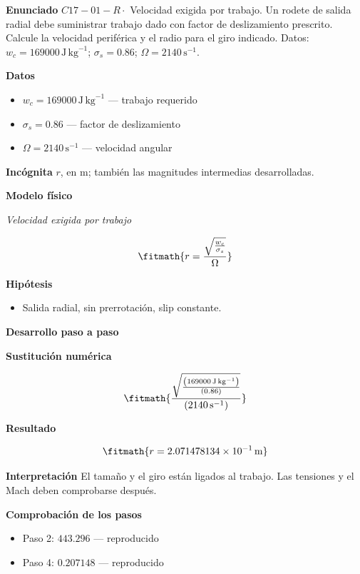\documentclass[10pt,openany]{book}
\begin{document}
\begin{tcolorbox}[title={Problema resuelto 1}, studiumworked, breakable]

\noindent\textbf{Enunciado}
\(C17-01-R \cdot\) Velocidad exigida por trabajo. Un rodete de salida radial debe suministrar trabajo dado con factor de deslizamiento prescrito. Calcule la velocidad periférica y el radio para el giro indicado. Datos: \(w_c=169000\, \mathrm{J}\,\mathrm{kg}^{-1}\); \(\sigma_s=0.86\); \(\Omega=2140\, \mathrm{s}^{-1}\).

\noindent\textbf{Datos}
\begin{itemize}
\item $w_c = 169000\,\mathrm{J}\,\mathrm{kg}^{-1}$ — trabajo requerido
\item $\sigma_s = 0.86$ — factor de deslizamiento
\item $\Omega = 2140\,\mathrm{s}^{-1}$ — velocidad angular
\end{itemize}

\noindent\textbf{Incógnita}
$r$, en $\mathrm{m}$; también las magnitudes intermedias desarrolladas.

\noindent\textbf{Modelo físico}

\noindent\textit{Velocidad exigida por trabajo}

\[
\fitmath{r=\frac{\sqrt{\frac{w_c}{\sigma_s}}}{\Omega}}
\]

\noindent\textbf{Hipótesis}
\begin{itemize}
\item Salida radial, sin prerrotación, slip constante.
\end{itemize}

\noindent\textbf{Desarrollo paso a paso}



\noindent\textbf{Sustitución numérica}

\[
\fitmath{\frac{\sqrt{\frac{\left(169000\,\mathrm{J}\,\mathrm{kg}^{-1}\right)}{\left(0.86\right)}}}{\left(2140\,\mathrm{s}^{-1}\right)}}
\]

\noindent\textbf{Resultado}

\[
\fitmath{r=2.071478134\times10^{-1}\,\mathrm{m}}
\]

\noindent\textbf{Interpretación}
El tamaño y el giro están ligados al trabajo. Las tensiones y el Mach deben comprobarse después.

\noindent\textbf{Comprobación de los pasos}
\begin{itemize}
\item Paso 2: $443.296$ — reproducido
\item Paso 4: $0.207148$ — reproducido
\end{itemize}


\end{tcolorbox}
\end{document}

